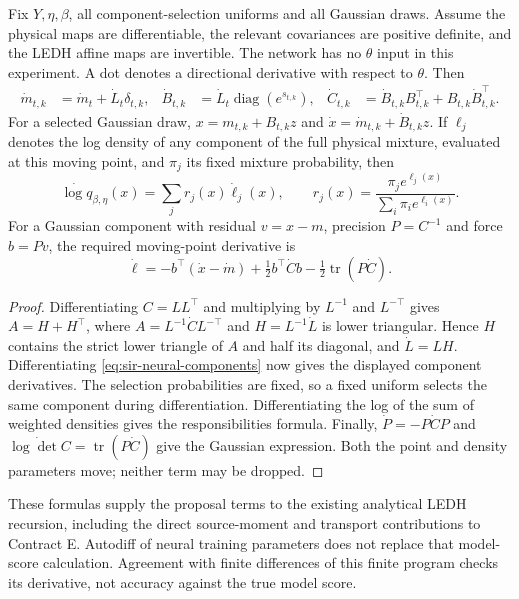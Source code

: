 \begin{proposition}
\label{prop:sir-neural-total-derivative}
Fix \(Y,\eta,\beta\), all component-selection uniforms and all Gaussian draws.
Assume the physical maps are differentiable, the relevant covariances are
positive definite, and the LEDH affine maps are invertible. The network has no
\(\theta\) input in this experiment. A dot denotes a directional derivative
with respect to \(\theta\). Then
\begin{align*}
 \dot m_{t,k}&=\dot m_t+\dot L_t\delta_{t,k},&
 \dot B_{t,k}&=\dot L_t\operatorname{diag}(e^{s_{t,k}}),&
 \dot C_{t,k}&=\dot B_{t,k}B_{t,k}^{\top}
                    +B_{t,k}\dot B_{t,k}^{\top}.
\end{align*}
For a selected Gaussian draw, \(x=m_{t,k}+B_{t,k}z\) and
\(\dot x=\dot m_{t,k}+\dot B_{t,k}z\). If \(\ell_j\) denotes the log
density of any component of the full physical mixture, evaluated at this
moving point, and \(\pi_j\) its fixed mixture probability, then
\[
 \dot{\log q}_{\beta,\eta}(x)
 =\sum_j r_j(x)\dot\ell_j(x),\qquad
 r_j(x)=\frac{\pi_j e^{\ell_j(x)}}{\sum_i\pi_i e^{\ell_i(x)}}.
\]
For a Gaussian component with residual \(v=x-m\), precision \(P=C^{-1}\)
and force \(b=Pv\), the required moving-point derivative is
\[
 \dot\ell=-b^\top(\dot x-\dot m)
       +\tfrac12 b^\top\dot C b-\tfrac12\operatorname{tr}(P\dot C).
\]
\end{proposition}
\begin{proof}
Differentiating \(C=LL^\top\) and multiplying by \(L^{-1}\) and
\(L^{-\top}\) gives \(A=H+H^\top\), where
\(A=L^{-1}\dot C L^{-\top}\) and \(H=L^{-1}\dot L\) is lower triangular.
Hence \(H\) contains the strict lower triangle of \(A\) and half its
diagonal, and \(\dot L=LH\). Differentiating
\eqref{eq:sir-neural-components} now gives the displayed component derivatives.
The selection probabilities are fixed, so a fixed uniform selects the same
component during differentiation. Differentiating the log of the sum of
weighted densities gives the responsibilities formula. Finally,
\(\dot P=-P\dot C P\) and
\(\dot{\log\det C}=\operatorname{tr}(P\dot C)\) give the Gaussian expression.
Both the point and density parameters move; neither term may be dropped.
\end{proof}

These formulas supply the proposal terms to the existing analytical LEDH
recursion, including the direct source-moment and transport contributions to
Contract E. Autodiff of neural training parameters does not replace that
model-score calculation. Agreement with finite differences of this finite
program checks its derivative, not accuracy against the true model score.

